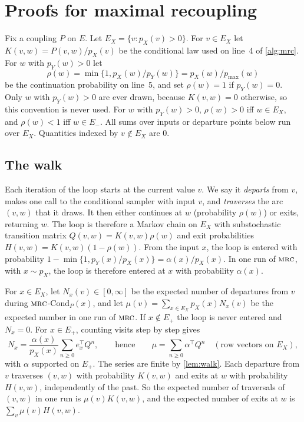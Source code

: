 \documentclass[11pt]{article}
\theoremstyle{definition}
\newcommand{\pX}{p_X}
\newcommand{\pY}{p_Y}
\newcommand{\pmax}{p_{\max}}
\newcommand{\Ep}{E_{+}}
\newcommand{\Em}{E_{-}}
\newcommand{\MRC}{\textnormal{\textsc{mrc}}}
\begin{document}
\section{Proofs for maximal recoupling}\label{sec:mrc-proofs}

Fix a coupling $P$ on $E$. Let $E_X=\{v:\pX(v)>0\}$. For $v\in E_X$ let
$K(v,w)=P(v,w)/\pX(v)$ be the conditional law used on line~4 of
\cref{alg:mrc}. For $w$ with $\pY(w)>0$ let
\[
  \rho(w)=\min\{1,\pX(w)/\pY(w)\}=\pX(w)/\pmax(w)
\]
be the continuation probability on line~5, and set $\rho(w)=1$ if $\pY(w)=0$.
Only $w$ with $\pY(w)>0$ are ever drawn, because $K(v,w)=0$ otherwise, so this
convention is never used. For $w$ with $\pY(w)>0$, $\rho(w)>0$ iff $w\in E_X$,
and $\rho(w)<1$ iff $w\in\Em$. All sums over inputs or departure points below
run over $E_X$. Quantities indexed by $v\notin E_X$ are $0$.

\subsection{The walk}

Each iteration of the loop starts at the current value $v$. We say it
\emph{departs} from $v$, makes one call to the conditional sampler with input
$v$, and \emph{traverses} the arc $(v,w)$ that it draws. It then either
continues at $w$ (probability $\rho(w)$) or exits, returning $w$. The loop is
therefore a Markov chain on $E_X$ with substochastic transition matrix
$Q(v,w)=K(v,w)\rho(w)$ and exit probabilities $H(v,w)=K(v,w)(1-\rho(w))$. From
the input $x$, the loop is entered with probability
$1-\min\{1,\pY(x)/\pX(x)\}=\alpha(x)/\pX(x)$. In one run of $\MRC$, with
$x\sim\pX$, the loop is therefore entered at $x$ with probability $\alpha(x)$.

For $x\in E_X$, let $N_x(v)\in[0,\infty]$ be the expected number of
departures from $v$ during $\MRC$-Cond$_P(x)$, and let
$\mu(v)=\sum_{x\in E_X}\pX(x)N_x(v)$ be the expected number in one run of
$\MRC$. If $x\notin\Ep$ the loop is never entered and $N_x=0$. For $x\in\Ep$,
counting visits step by step gives
\[
  N_x=\frac{\alpha(x)}{\pX(x)}\sum_{n\ge0}e_x^{\top}Q^n,\qquad\text{hence}\qquad
  \mu=\sum_{n\ge0}\alpha^{\top}Q^n \quad(\text{row vectors on }E_X),
\]
with $\alpha$ supported on $\Ep$. The series are finite by \cref{lem:walk}.
Each departure from $v$ traverses $(v,w)$ with probability $K(v,w)$ and exits
at $w$ with probability $H(v,w)$, independently of the past. So the expected
number of traversals of $(v,w)$ in one run is $\mu(v)K(v,w)$, and the expected
number of exits at $w$ is $\sum_v\mu(v)H(v,w)$.
\end{document}
